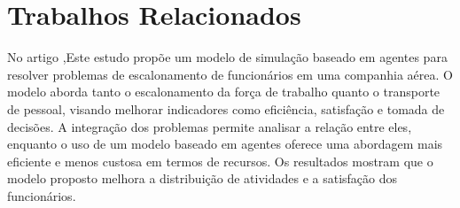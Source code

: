 \section{Trabalhos Relacionados}

No artigo \cite{ceballos2021airline},Este estudo propõe um modelo de simulação baseado em agentes para resolver problemas de escalonamento de funcionários em uma companhia aérea. O modelo aborda tanto o escalonamento da força de trabalho quanto o transporte de pessoal, visando melhorar indicadores como eficiência, satisfação e tomada de decisões. A integração dos problemas permite analisar a relação entre eles, enquanto o uso de um modelo baseado em agentes oferece uma abordagem mais eficiente e menos custosa em termos de recursos. Os resultados mostram que o modelo proposto melhora a distribuição de atividades e a satisfação dos funcionários.